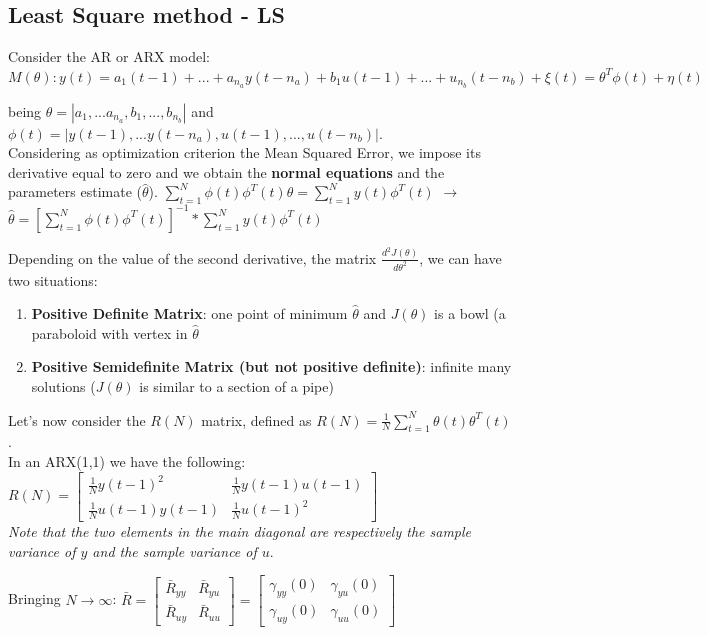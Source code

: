 \documentclass[10pt,a4paper]{article}
\begin{document}
\subsection{Least Square method - LS}
Consider the AR or ARX model:
\center $M(\theta):y(t)=a_1(t-1)+...+a_{n_a}y(t-n_a)+b_1u(t-1)+...+u_{n_b}(t-n_b)+\xi(t)= \theta^T\phi(t)+\eta(t)$
\\ \raggedright \vspace{0.5em}
being $\theta = |a_1, ... a_{n_a}, b_1, ..., b_{n_b}|$ and 
$\phi(t)=|y(t-1), ... y(t-n_a), u(t-1), ..., u(t-n_b)|$. \\
Considering as optimization criterion the Mean Squared Error, we impose its derivative equal to zero and we obtain the \textbf{normal equations} and the parameters estimate ($\hat{\theta}$).
\center
	$\sum_{t=1}^N\phi(t)\phi^T(t)\theta = \sum_{t=1}^Ny(t)\phi^T(t)$ $\rightarrow$ $\hat{\theta}=[\sum_{t=1}^N\phi(t)\phi^T(t)]^{-1}*\sum_{t=1}^Ny(t)\phi^T(t)$ 
\\ \raggedright \vspace{0.5em}
Depending on the value of the second derivative, the matrix $\frac{d^2J(\theta)}{d\theta^2}$, we can have two situations:
\begin{enumerate}
	\item \textbf{Positive Definite Matrix}: one point of minimum $\hat{\theta}$ and $J(\theta)$ is a bowl (a paraboloid with vertex in $\hat{\theta}$
	\item \textbf{Positive Semidefinite Matrix (but not positive definite)}: infinite many solutions ($ J(\theta)$ is similar to a section of a pipe)
\end{enumerate}
Let's now consider the $R(N)$ matrix, defined as $R(N)=\frac{1}{N}\sum_{t=1}^N\theta(t)\theta^T(t)$. \\
In an ARX(1,1) we have the following:
\center
$R(N) = \begin{bmatrix}
\frac{1}{N}y(t-1)^2 & \frac{1}{N}y(t-1)u(t-1)\\
\frac{1}{N}u(t-1)y(t-1) & \frac{1}{N}u(t-1)^2
\end{bmatrix}$ \\ \vspace{0.3em}
\textit{Note that the two elements in the main diagonal are respectively the sample variance of $y$ and the sample variance of $u$}. \\
\raggedright
\pagebreak
Bringing $N \rightarrow \infty$:
$\bar{R}= \begin{bmatrix}
\bar{R}_{yy} & \bar{R}_{yu}\\
\bar{R}_{uy} & \bar{R}_{uu}
\end{bmatrix} = \begin{bmatrix}
\gamma_{yy}(0) & \gamma_{yu}(0)\\
\gamma_{uy}(0) & \gamma_{uu}(0)
\end{bmatrix}$ \\ \vspace{0.5em}
\end{document}
